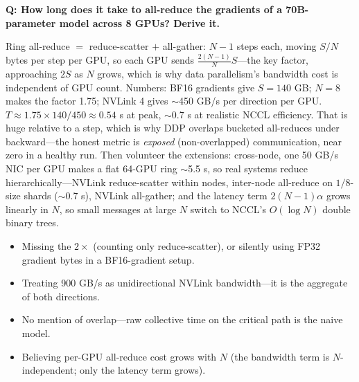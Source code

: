 \begin{interviewq}
\end{interviewq}

\begin{interviewq}
\textbf{Q: How long does it take to all-reduce the gradients of a 70B-parameter model across 8 GPUs? Derive it.}

 \quad {} \quad \badgefreq{\freqmed}

\stronganswer Ring all-reduce $=$ reduce-scatter $+$ all-gather: $N-1$ steps each, moving $S/N$ bytes per step per GPU, so each GPU sends $\frac{2(N-1)}{N} S$---the key factor, approaching $2S$ as $N$ grows, which is why data parallelism's bandwidth cost is independent of GPU count. Numbers: BF16 gradients give $S = 140$ GB; $N = 8$ makes the factor 1.75; NVLink 4 gives $\sim$450 GB/s per direction per GPU. $T \approx 1.75 \times 140/450 \approx 0.54$ s at peak, $\sim$0.7 s at realistic NCCL efficiency. That is huge relative to a step, which is why DDP overlaps bucketed all-reduces under backward---the honest metric is \textit{exposed} (non-overlapped) communication, near zero in a healthy run. Then volunteer the extensions: cross-node, one 50 GB/s NIC per GPU makes a flat 64-GPU ring $\sim$5.5 s, so real systems reduce hierarchically---NVLink reduce-scatter within nodes, inter-node all-reduce on $1/8$-size shards ($\sim$0.7 s), NVLink all-gather; and the latency term $2(N-1)\alpha$ grows linearly in $N$, so small messages at large $N$ switch to NCCL's $O(\log N)$ double binary trees.

\redflags
\begin{itemize}
    \item Missing the $2\times$ (counting only reduce-scatter), or silently using FP32 gradient bytes in a BF16-gradient setup.
    \item Treating 900 GB/s as unidirectional NVLink bandwidth---it is the aggregate of both directions.
    \item No mention of overlap---raw collective time on the critical path is the naive model.
    \item Believing per-GPU all-reduce cost grows with $N$ (the bandwidth term is $N$-independent; only the latency term grows).
\end{itemize}


\end{interviewq}

